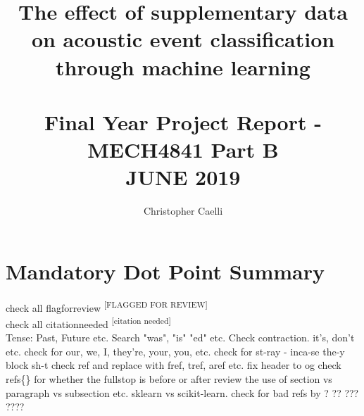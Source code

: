 \documentclass{UoNMCHA}
\newcommand{\citationneeded}{\textsuperscript{\color{blue} [citation needed]}}
\newcommand{\flagforreview}{\textsuperscript{\color{red} [FLAGGED FOR REVIEW]}}
\numberwithin{equation}{section}
\begin{document}
\title{The effect of supplementary data on acoustic event classification through machine learning \\ \ \\
{\small Final Year Project Report - MECH4841 Part B  \\JUNE 2019}}
\author[UoNMCHA]{Christopher Caelli}
\address[UoNMCHA]{
Student of Mechatronics Engineering,\\
The University of Newcastle, Callaghan, NSW 2308, AUSTRALIA \\
E-mail: \href{mailto:Christopher.Caelli@uon.edu.au}{\textsf{Christopher.Caelli@uon.edu.au}}}
\maketitle
\onecolumn

\vspace{-5mm}
\section*{Mandatory Dot Point Summary}
\vspace{-3mm}

check all flagforreview \flagforreview \\
check all citationneeded \citationneeded \\
Tense: Past, Future etc. Search "was", "is" "ed" etc.
Check contraction. it's, don't etc.
check for our, we, I, they're, your, you, etc.
check for st-ray - inca-se the-y block sh-t
check ref and replace with fref, tref, aref etc.
fix header to og %
check \\refs\{\} for whether the fullstop is before or after
review the use of section vs paragraph vs subsection etc.
sklearn vs scikit-learn.
check for bad refs by ? ?? ??? ????
\end{document}
